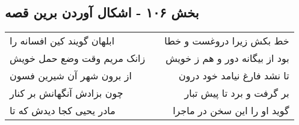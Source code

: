 \begin{center}
\section*{بخش ۱۰۶ - اشکال آوردن برین قصه}
\label{sec:sh106}
\begin{longtable}{l p{0.5cm} r}
ابلهان گویند کین افسانه را
&&
خط بکش زیرا دروغست و خطا
\\
زانک مریم وقت وضع حمل خویش
&&
بود از بیگانه دور و هم ز خویش
\\
از برون شهر آن شیرین فسون
&&
تا نشد فارغ نیامد خود درون
\\
چون بزادش آنگهانش بر کنار
&&
بر گرفت و برد تا پیش تبار
\\
مادر یحیی کجا دیدش که تا
&&
گوید او را این سخن در ماجرا
\\
\end{longtable}
\end{center}
